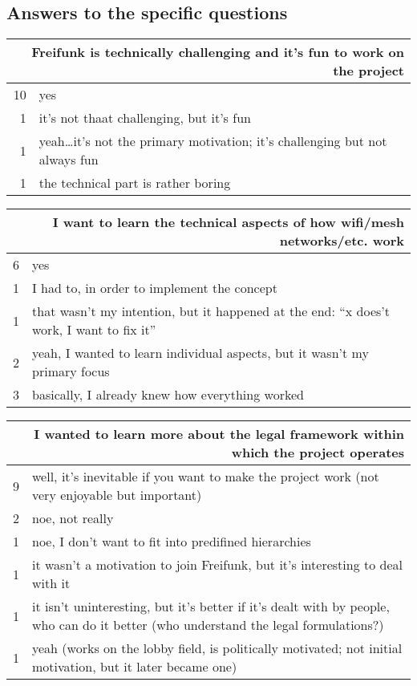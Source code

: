 \subsection{Answers to the specific questions}

\begin{table}[h]
  \begin{tabular}{| r | p{\textwidth} |}
    \hline
    \multicolumn{2}{|p{\textwidth}|}{Freifunk is technically challenging and it's fun to work on the project} \\
    \hline
    10 & yes \\
    1  & it's not thaat challenging, but it's fun \\
    1  & yeah\ldots it's not the primary motivation; it's challenging but not always fun \\
    1  & the technical part is rather boring \\
    \hline
  \end{tabular}
\end{table}

\begin{table}[h]
  \begin{tabular}{| r | p{\textwidth} |}
    \hline
    \multicolumn{2}{|p{\textwidth}|}{I want to learn the technical aspects of how wifi/mesh networks/etc. work} \\
    \hline
    6 & yes \\
    1 & I had to, in order to implement the concept \\
    1 & that wasn't my intention, but it happened at the end: ``x does't work, I want to fix it'' \\
    2 & yeah, I wanted to learn individual aspects, but it wasn't my primary focus \\
    3 & basically, I already knew how everything worked \\
    \hline
  \end{tabular}
\end{table}

\begin{table}[h]
  \begin{tabular}{| r | p{\textwidth} |}
    \hline
    \multicolumn{2}{|p{\textwidth}|}{I wanted to learn more about the legal framework within which the project operates} \\
    \hline
    9 & well, it's inevitable if you want to make the project work (not very enjoyable but important) \\
    2 & noe, not really \\
    1 & noe, I don't want to fit into predifined hierarchies \\
    1 & it wasn't a motivation to join Freifunk, but it's interesting to deal with it \\
    1 & it isn't uninteresting, but it's better if it's dealt with by people, who can do it better (who understand the legal formulations?) \\
    1 & yeah (works on the lobby field, is politically motivated; not initial motivation, but it later became one) \\
    \hline
  \end{tabular}
\end{table}

